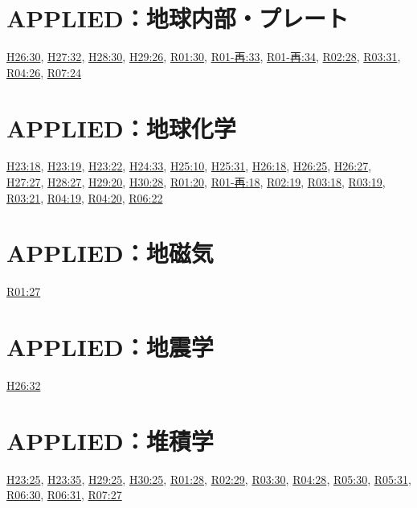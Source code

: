\section{APPLIED：地球内部・プレート}
\hyperref[q:h26-reg-applied-30]{H26:30}, \hyperref[q:h27-reg-applied-32]{H27:32}, \hyperref[q:h28-reg-applied-30]{H28:30}, \hyperref[q:h29-reg-applied-26]{H29:26}, \hyperref[q:r01-reg-applied-30]{R01:30}, \hyperref[q:r01-ret-applied-33]{R01-再:33}, \hyperref[q:r01-ret-applied-34]{R01-再:34}, \hyperref[q:r02-reg-applied-28]{R02:28}, \hyperref[q:r03-reg-applied-31]{R03:31}, \hyperref[q:r04-reg-applied-26]{R04:26}, \hyperref[q:r07-reg-applied-24]{R07:24}
\section{APPLIED：地球化学}
\hyperref[q:h23-reg-applied-18]{H23:18}, \hyperref[q:h23-reg-applied-19]{H23:19}, \hyperref[q:h23-reg-applied-22]{H23:22}, \hyperref[q:h24-reg-applied-33]{H24:33}, \hyperref[q:h25-reg-applied-10]{H25:10}, \hyperref[q:h25-reg-applied-31]{H25:31}, \hyperref[q:h26-reg-applied-18]{H26:18}, \hyperref[q:h26-reg-applied-25]{H26:25}, \hyperref[q:h26-reg-applied-27]{H26:27}, \hyperref[q:h27-reg-applied-27]{H27:27}, \hyperref[q:h28-reg-applied-27]{H28:27}, \hyperref[q:h29-reg-applied-20]{H29:20}, \hyperref[q:h30-reg-applied-28]{H30:28}, \hyperref[q:r01-reg-applied-20]{R01:20}, \hyperref[q:r01-ret-applied-18]{R01-再:18}, \hyperref[q:r02-reg-applied-19]{R02:19}, \hyperref[q:r03-reg-applied-18]{R03:18}, \hyperref[q:r03-reg-applied-19]{R03:19}, \hyperref[q:r03-reg-applied-21]{R03:21}, \hyperref[q:r04-reg-applied-19]{R04:19}, \hyperref[q:r04-reg-applied-20]{R04:20}, \hyperref[q:r06-reg-applied-22]{R06:22}
\section{APPLIED：地磁気}
\hyperref[q:r01-reg-applied-27]{R01:27}
\section{APPLIED：地震学}
\hyperref[q:h26-reg-applied-32]{H26:32}
\section{APPLIED：堆積学}
\hyperref[q:h23-reg-applied-25]{H23:25}, \hyperref[q:h23-reg-applied-35]{H23:35}, \hyperref[q:h29-reg-applied-25]{H29:25}, \hyperref[q:h30-reg-applied-25]{H30:25}, \hyperref[q:r01-reg-applied-28]{R01:28}, \hyperref[q:r02-reg-applied-29]{R02:29}, \hyperref[q:r03-reg-applied-30]{R03:30}, \hyperref[q:r04-reg-applied-28]{R04:28}, \hyperref[q:r05-reg-applied-30]{R05:30}, \hyperref[q:r05-reg-applied-31]{R05:31}, \hyperref[q:r06-reg-applied-30]{R06:30}, \hyperref[q:r06-reg-applied-31]{R06:31}, \hyperref[q:r07-reg-applied-27]{R07:27}

